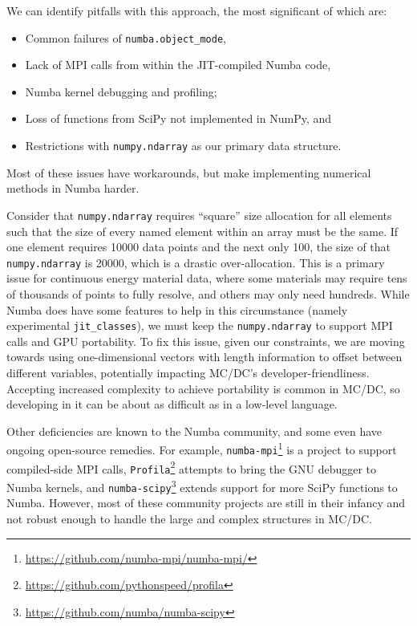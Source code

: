 We can identify pitfalls with this approach, the most significant of which are:
\begin{itemize}
    \item Common failures of \texttt{numba.object\_mode},
    \item Lack of MPI calls from within the JIT-compiled Numba code,
    \item Numba kernel debugging and profiling;
    \item Loss of functions from SciPy not implemented in NumPy, and
    \item Restrictions with \texttt{numpy.ndarray} as our primary data structure.
\end{itemize}
Most of these issues have workarounds, but make implementing numerical methods in Numba harder.

Consider that \texttt{numpy.ndarray} requires ``square'' size allocation for all elements such that the size of every named element within an array must be the same.
If one element requires \num{10000} data points and the next only \num{100}, the size of that \texttt{numpy.ndarray} is \num{20000}, which is a drastic over-allocation.
This is a primary issue for continuous energy material data, where some materials may require tens of thousands of points to fully resolve, and others may only need hundreds.
While Numba does have some features to help in this circumstance (namely experimental \texttt{jit\_classes}), we must keep the \texttt{numpy.ndarray} to support MPI calls and GPU portability.
To fix this issue, given our constraints, we are moving towards using one-dimensional vectors with length information to offset between different variables, potentially impacting MC/DC's developer-friendliness.
Accepting increased complexity to achieve portability is common in MC/DC, so developing in it can be about as difficult as in a low-level language.

Other deficiencies are known to the Numba community, and some even have ongoing open-source remedies.
For example, \texttt{numba-mpi}\footnote{\url{https://github.com/numba-mpi/numba-mpi/}} is a project to support compiled-side MPI calls, \texttt{Profila}\footnote{\url{https://github.com/pythonspeed/profila}} attempts to bring the GNU debugger to Numba kernels, and \texttt{numba-scipy}\footnote{\url{https://github.com/numba/numba-scipy}} extends support for more SciPy functions to Numba.
However, most of these community projects are still in their infancy and not robust enough to handle the large and complex structures in MC/DC.

